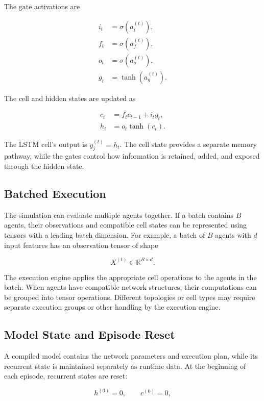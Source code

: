 \documentclass[11pt]{article}
\begin{document}
The gate activations are

\[
\begin{aligned}
    i_t &= \sigma(a_i^{(t)}), \\
    f_t &= \sigma(a_f^{(t)}), \\
    o_t &= \sigma(a_o^{(t)}), \\
    g_t &= \tanh(a_g^{(t)}).
\end{aligned}
\]

The cell and hidden states are updated as

\[
\begin{aligned}
    c_t &= f_t c_{t-1} + i_t g_t, \\
    h_t &= o_t \tanh(c_t).
\end{aligned}
\]

The LSTM cell's output is \(y_j^{(t)} = h_t\). The cell state provides
a separate memory pathway, while the gates control how information is
retained, added, and exposed through the hidden state.

\subsection{Batched Execution}

The simulation can evaluate multiple agents together. If a batch
contains \(B\) agents, their observations and compatible cell states
can be represented using tensors with a leading batch dimension. For
example, a batch of \(B\) agents with \(d\) input features has an
observation tensor of shape

\[
    X^{(t)} \in \mathbb{R}^{B \times d}.
\]

The execution engine applies the appropriate cell operations to the
agents in the batch. When agents have compatible network
structures, their computations can be grouped into tensor operations.
Different topologies or cell types may require separate execution
groups or other handling by the execution engine.

\subsection{Model State and Episode Reset}

A compiled model contains the network parameters and execution plan,
while its recurrent state is maintained separately as runtime data.
At the beginning of each episode, recurrent states are reset:

\[
    h^{(0)} = 0,
    \qquad
    c^{(0)} = 0,
\]
\end{document}
